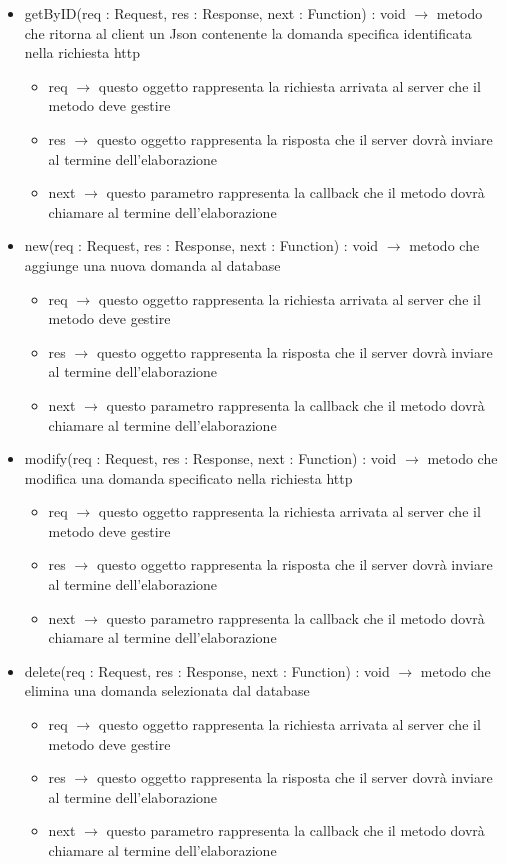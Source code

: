 \begin{description}
\begin{itemize}
	\item getByID(req : Request, res : Response, next : Function) : void $\rightarrow$ metodo che ritorna al client un Json contenente la domanda specifica identificata nella richiesta http\begin{itemize}
		\item req $\rightarrow$ questo oggetto rappresenta la richiesta arrivata al server che il metodo deve gestire
		\item res $\rightarrow$ questo oggetto rappresenta la risposta che il server dovrà inviare al termine dell'elaborazione
		\item next $\rightarrow$ questo parametro rappresenta la callback che il metodo dovrà chiamare al termine dell’elaborazione
	\end{itemize}
	
	\item new(req : Request, res : Response, next : Function) : void $\rightarrow$ metodo che aggiunge una nuova domanda al database\begin{itemize}
		\item req $\rightarrow$ questo oggetto rappresenta la richiesta arrivata al server che il metodo deve gestire
		\item res $\rightarrow$ questo oggetto rappresenta la risposta che il server dovrà inviare al termine dell'elaborazione
		\item next $\rightarrow$ questo parametro rappresenta la callback che il metodo dovrà chiamare al termine dell’elaborazione
	\end{itemize}
	
	\item modify(req : Request, res : Response, next : Function) : void $\rightarrow$ metodo che modifica una domanda specificato nella richiesta http\begin{itemize}
		\item req $\rightarrow$ questo oggetto rappresenta la richiesta arrivata al server che il metodo deve gestire
		\item res $\rightarrow$ questo oggetto rappresenta la risposta che il server dovrà inviare al termine dell'elaborazione
		\item next $\rightarrow$ questo parametro rappresenta la callback che il metodo dovrà chiamare al termine dell’elaborazione
	\end{itemize}
	
	\item delete(req : Request, res : Response, next : Function) : void $\rightarrow$ metodo che elimina una domanda selezionata dal database\begin{itemize}
		\item req $\rightarrow$ questo oggetto rappresenta la richiesta arrivata al server che il metodo deve gestire
		\item res $\rightarrow$ questo oggetto rappresenta la risposta che il server dovrà inviare al termine dell'elaborazione
		\item next $\rightarrow$ questo parametro rappresenta la callback che il metodo dovrà chiamare al termine dell’elaborazione
	\end{itemize}
	

\end{itemize}
\end{description}

